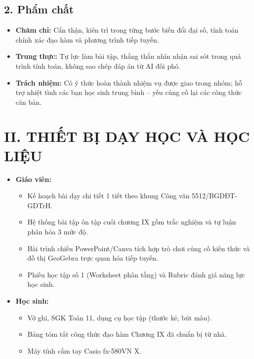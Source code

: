 \documentclass[12pt, a4paper]{article}
\begin{document}
\subsection*{2. Phẩm chất}

\begin{itemize}[leftmargin=1.2cm]
    \item \textbf{Chăm chỉ:} Cẩn thận, kiên trì trong từng bước biến đổi đại số, tính toán chính xác đạo hàm và phương trình tiếp tuyến.
    \item \textbf{Trung thực:} Tự lực làm bài tập, thẳng thắn nhìn nhận sai sót trong quá trình tính toán, không sao chép đáp án từ AI đối phó.
    \item \textbf{Trách nhiệm:} Có ý thức hoàn thành nhiệm vụ được giao trong nhóm; hỗ trợ nhiệt tình các bạn học sinh trung bình -- yếu củng cố lại các công thức căn bản.
\end{itemize}

\section*{II. THIẾT BỊ DẠY HỌC VÀ HỌC LIỆU}

\begin{itemize}[leftmargin=1.2cm]
    \item \textbf{Giáo viên:}
    \begin{itemize}[leftmargin=0.6cm]
        \item Kế hoạch bài dạy chi tiết 1 tiết theo khung Công văn 5512/BGDĐT-GDTrH.
        \item Hệ thống bài tập ôn tập cuối chương IX gồm trắc nghiệm và tự luận phân hóa 3 mức độ.
        \item Bài trình chiếu PowerPoint/Canva tích hợp trò chơi củng cố kiến thức và đồ thị GeoGebra trực quan hóa tiếp tuyến.
        \item Phiếu học tập số 1 (Worksheet phân tầng) và Rubric đánh giá năng lực học sinh.
    \end{itemize}
    \item \textbf{Học sinh:}
    \begin{itemize}[leftmargin=0.6cm]
        \item Vở ghi, SGK Toán 11, dụng cụ học tập (thước kẻ, bút màu).
        \item Bảng tóm tắt công thức đạo hàm Chương IX đã chuẩn bị từ nhà.
        \item Máy tính cầm tay Casio fx-580VN X.
    \end{itemize}
\end{itemize}
\end{document}
